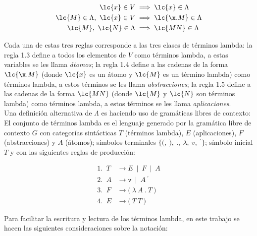 \begin{align}
  \lc{x} \in V &\implies \lc{x} \in \Lambda \\
  \lc{M} \in \Lambda,\ \lc{x} \in V &\implies \lc{\x.M} \in \Lambda \\
  \lc{M},\ \lc{N} \in \Lambda &\implies \lc{M N} \in \Lambda \\
\end{align}

Cada una de estas tres reglas corresponde a las tres clases de términos lambda:
la regla 1.3 define a todos los elementos de \(V\) como términos lambda, a estas
variables se les llama \emph{átomos}; la regla 1.4 define a las cadenas de la
forma \(\lc{\x.M}\) (donde \(\lc{x}\) es un átomo y \(\lc{M}\) es un término
lambda) como términos lambda, a estos términos se les llama
\emph{abstracciones}; la regla 1.5 define a las cadenas de la forma \(\lc{M N}\)
(donde \(\lc{M}\) y \(\lc{N}\) son términos lambda) como términos lambda, a
estos términos se les llama \emph{aplicaciones}. \\

Una definición alternativa de \(\Lambda\) es haciendo uso de gramáticas libres
de contexto: El conjunto de términos lambda es el lenguaje generado por la
gramática libre de contexto \(G\) con categorías sintácticas \(T\) (términos
lambda), \(E\) (aplicaciones), \(F\) (abstracciones) y \(A\) (átomos); símbolos
terminales \(\{\texttt{(},\ \texttt{)},\ \texttt{.},\ \lambda,\ v,\
{}^{\prime}\}\); símbolo inicial \(T\) y con las siguientes reglas de
producción:

\begin{align*}
  \text{1. }\ T &\rightarrow E\ \mid\ F\ \mid\ A \\ 
  \text{2. }\ A &\rightarrow \texttt{v}\ \mid\ A\ {}^{\prime} \\
  \text{3. }\ F &\rightarrow \texttt{(}\ \lambda\ A\ \texttt{.}\ T\ \texttt{)} \\
  \text{4. }\ E &\rightarrow \texttt{(}\ T\ T\ \texttt{)}
\end{align*}

Para facilitar la escritura y lectura de los términos lambda, en este trabajo se
hacen las siguientes consideraciones sobre la notación: \\

